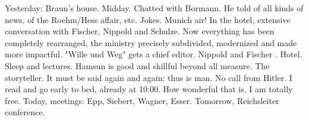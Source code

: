 
Yesterday: Braun's house. Midday. Chatted with Bormann. He told of all kinds of news, of the Roehm/Hess affair, etc. Jokes. Munich air! In the hotel, extensive conversation with Fischer, Nippold and Schulze.  Now everything has been completely rearranged, the ministry precisely subdivided, modernized and made more impactful. "Wille und Weg" gets a chief editor. Nippold and Fischer .
Hotel. Sleep and lectures. Hamsun is good and skillful beyond all measure. The  storyteller. It must be said again and again: thus is man. No call from Hitler. I read and go early to bed, already at 10:00. How wonderful that is. I am totally free. Today, meetings: Epp, Siebert, Wagner, Esser. Tomorrow, Reichsleiter conference. 